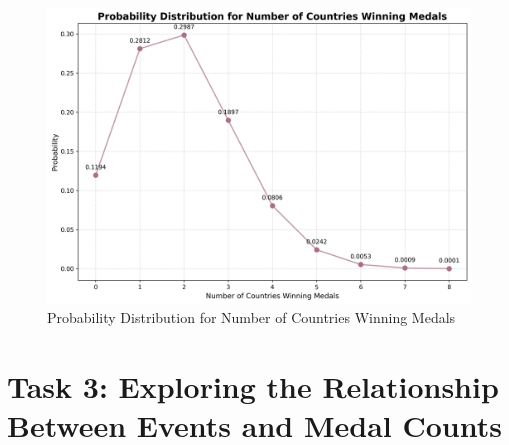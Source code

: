 \documentclass[12pt]{article}  %
\begin{document}
\begin{enumerate}[\textbullet]
    \begin{figure}[H]
        \centering
        \includegraphics[width=0.75\linewidth]{Probability Distribution for Number of Countries Winning Medals.png}
        \caption{Probability Distribution for Number of Countries Winning Medals}
        \label{fig:enter-label}
    \end{figure}

\end{enumerate}

\section{Task 3: Exploring the Relationship Between Events and Medal Counts}
\end{document}
